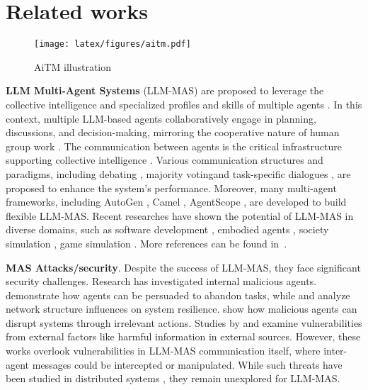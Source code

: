 \section{Related works}

\begin{figure*}[t]
    \centering
    \texttt{[image: latex/figures/aitm.pdf]}
    \caption{AiTM illustration}
    \label{fig:aitm}
\end{figure*}

\textbf{LLM Multi-Agent Systems} (LLM-MAS)
are proposed to leverage the collective intelligence and specialized profiles and skills of multiple agents \citep{guo2024large, han2024llm}. In this context, multiple LLM-based agents collaboratively engage in planning, discussions, and decision-making, mirroring the cooperative nature of human group work \citep{he2024make, talebirad2023multi, zhang2023exploring, park2023generative}. The communication between agents is the critical infrastructure supporting collective intelligence \citep{guo2024large}. Various communication structures and paradigms, including debating \citep{du2023improving, xiong2023examining}, majority voting\citep{zhao2024electoral}and task-specific dialogues \citep{hong2023metagpt}, are proposed to enhance the system's performance. Moreover, many multi-agent frameworks, including AutoGen \citep{wu2023autogen}, Camel \citep{li2023camel}, AgentScope \citep{gao2024agentscope}, are developed to build flexible LLM-MAS. Recent researches have shown the potential of LLM-MAS in diverse domains, such as software development \citep{hong2023metagpt, qian2024chatdev, qian2023communicative}, embodied agents \citep{guo2024embodied, song2023llm, mandi2024roco}, society simulation \citep{park2023generative, gao2023s}, game simulation \citep{xu2023language, wang2023avalon}. More references can be found in~\citep{zhang2024generative, zhang2023exploring, li2023large}.



\noindent \textbf{MAS Attacks/security}. Despite the success of LLM-MAS, they face significant security challenges. Research has investigated internal malicious agents.  \citet{amayuelas2024multiagent} demonstrate how agents can be persuaded to abandon tasks, while \citet{yu2024netsafe} and \citet{huang2024resilience} analyze network structure influences on system resilience. \citet{zhang2024breaking} show how malicious agents can disrupt systems through irrelevant actions. Studies by \citet{zhang2024psysafe, zhang2024breaking} and \citet{lee2024prompt} examine vulnerabilities from external factors like harmful information in external sources. However, these works overlook vulnerabilities in LLM-MAS communication itself, 
where inter-agent messages could be intercepted or manipulated. 
While such threats have been studied in distributed systems \citep{belapurkar2009distributed}, they remain unexplored for LLM-MAS. 

